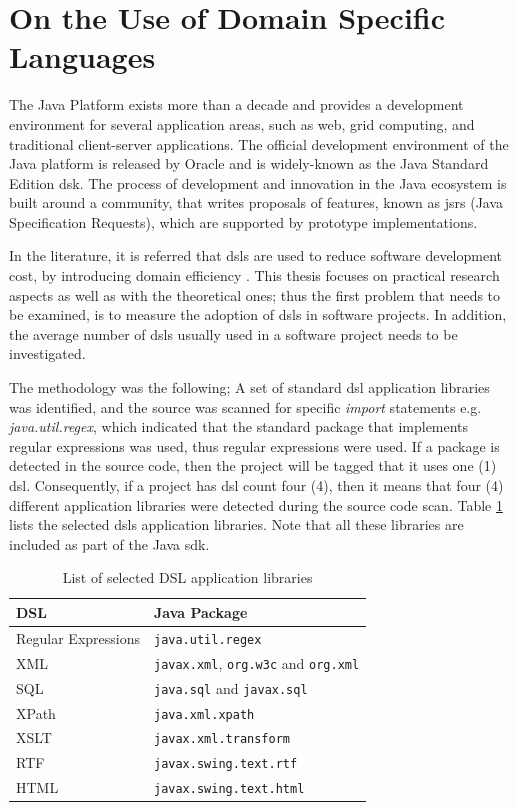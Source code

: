 \documentclass{sig-alternate}
\begin{document}
\section{On the Use of Domain Specific Languages}
\label{sec:dsl}

The Java Platform exists more than a decade and provides a development environment for several application areas, such as web, grid computing, and traditional client-server applications. The official development environment of the Java platform is released by Oracle and is widely-known as the Java Standard Edition {\sc dsk}. The process of development and innovation in the Java ecosystem is built around a community, that writes proposals of features, known as {\sc jsr}s (Java Specification Requests), which are supported by prototype implementations.

In the literature, it is referred that {\sc dsl}s are used to reduce software development cost, by introducing domain efficiency \cite{MHS05}. This thesis focuses on practical research aspects as well as with the theoretical ones; thus the first problem that needs to be examined, is to measure the adoption of {\sc dsl}s in software projects. In addition, the average number of {\sc dsl}s usually used in a software project needs to be investigated.

The methodology was the following; A set of standard {\sc dsl} application libraries was identified, and the source was scanned for specific \textit{import} statements e.g. \textit{java.util.regex}, which indicated that the standard package that implements regular expressions was used, thus regular expressions were used. If a package is detected in the source code, then the project will be tagged that it uses one (1) {\sc dsl}. Consequently, if a project has {\sc dsl} count four (4), then it means that four (4) different application libraries were detected during the source code scan. Table \ref{tbl:dsl-list} lists the selected {\sc dsl}s application libraries. Note that all these libraries are included as part of the Java {\sc sdk}.

\begin{table}
\centering
\caption{List of selected DSL application libraries}
\label{tbl:dsl-list}
\begin{tabular}{l l}
 \hline
\textbf{DSL} & \textbf{Java Package}\\
\hline
Regular Expressions & \verb|java.util.regex|\\
XML & \verb|javax.xml|, \verb|org.w3c| and \verb|org.xml|\\
SQL & \verb|java.sql| and \verb|javax.sql|\\
XPath & \verb|java.xml.xpath|\\
XSLT & \verb|javax.xml.transform|\\
RTF & \verb|javax.swing.text.rtf|\\
HTML & \verb|javax.swing.text.html|\\
\hline
\end{tabular}
\end{table}
\end{document}
